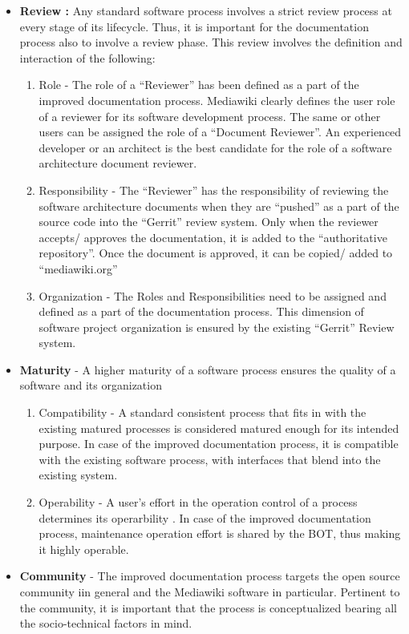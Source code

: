 \begin{itemize}
\item \textbf{Review : } Any standard software process involves a strict review process at every stage of its lifecycle. Thus, it is important for the documentation process also to involve a review phase. This review involves the definition and interaction of the following:
\begin{enumerate}
\item Role - The role of a \enquote{Reviewer} has been defined as a part of the improved documentation process. Mediawiki clearly defines the user role of a reviewer for its software development process. The same or other users can be assigned the role of a \enquote{Document Reviewer}. An experienced developer or an architect is the best candidate for the role of a software architecture document reviewer.
\item Responsibility - The \enquote{Reviewer} has the responsibility of reviewing the software architecture documents when they are \enquote{pushed} as a part of the source code into the \enquote{Gerrit} review system. Only when the reviewer accepts/ approves the documentation, it is added to the \enquote{authoritative repository}. Once the document is approved, it can be copied/ added to \enquote{mediawiki.org}
\item Organization - The Roles and Responsibilities need to be assigned and defined as a part of the documentation process. This dimension of software project organization is ensured by the existing \enquote{Gerrit} Review system.
\end{enumerate}
\item \textbf{Maturity} - A higher maturity of a software process ensures the quality of a software and its organization
\begin{enumerate}
\item Compatibility - A standard consistent process that fits in with the existing matured processes is considered matured enough for its intended purpose. In case of the improved documentation process, it is compatible with the existing software process, with interfaces that blend into the existing system.
\item Operability - A user's effort in the operation control of a process determines its operarbility \cite{Berander2005}. In case of the improved documentation process, maintenance operation effort is shared by the BOT, thus making it highly operable.
\end{enumerate}
\item \textbf{Community} - The improved documentation process targets the open source community iin general and the Mediawiki software in particular. Pertinent to the community, it is important that the process is conceptualized bearing all the socio-technical factors in mind. 

\end{itemize}
